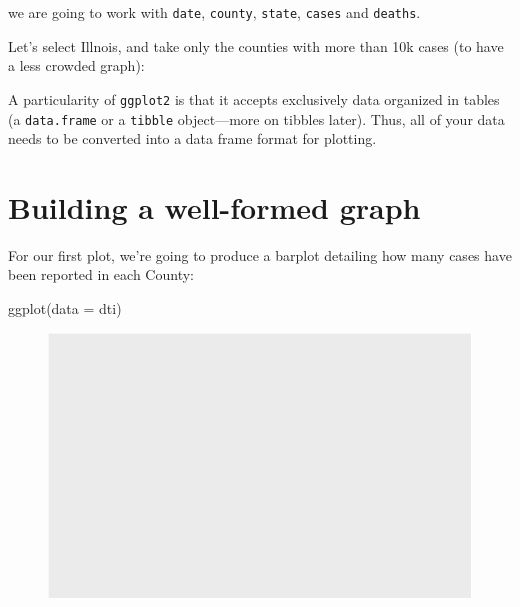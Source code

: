 \documentclass[
  letterpaper,
  DIV=11,
  numbers=noendperiod]{scrreprt}
\newenvironment{Shaded}{\begin{snugshade}}{\end{snugshade}}
\newcommand{\AttributeTok}[1]{\textcolor[rgb]{0.40,0.45,0.13}{#1}}
\newcommand{\DecValTok}[1]{\textcolor[rgb]{0.68,0.00,0.00}{#1}}
\newcommand{\FunctionTok}[1]{\textcolor[rgb]{0.28,0.35,0.67}{#1}}
\newcommand{\NormalTok}[1]{\textcolor[rgb]{0.00,0.23,0.31}{#1}}
\newcommand{\OtherTok}[1]{\textcolor[rgb]{0.00,0.23,0.31}{#1}}
\newcommand{\SpecialCharTok}[1]{\textcolor[rgb]{0.37,0.37,0.37}{#1}}
\newcommand{\StringTok}[1]{\textcolor[rgb]{0.13,0.47,0.30}{#1}}
\begin{document}
we are going to work with \texttt{date}, \texttt{county},
\texttt{state}, \texttt{cases} and \texttt{deaths}.

Let's select Illnois, and take only the counties with more than 10k
cases (to have a less crowded graph):

\begin{Shaded}
\end{Shaded}

A particularity of \texttt{ggplot2} is that it accepts exclusively data
organized in tables (a \texttt{data.frame} or a \texttt{tibble}
object---more on tibbles later). Thus, all of your data needs to be
converted into a data frame format for plotting.

\hypertarget{building-a-well-formed-graph}{%
\section{Building a well-formed
graph}\label{building-a-well-formed-graph}}

For our first plot, we're going to produce a barplot detailing how many
cases have been reported in each County:

\begin{Shaded}
\begin{Highlighting}[]
\FunctionTok{ggplot}\NormalTok{(}\AttributeTok{data =}\NormalTok{ dti)}
\end{Highlighting}
\end{Shaded}

\begin{figure}[H]

{\centering \includegraphics{./01-dataviz_files/figure-pdf/unnamed-chunk-4-1.pdf}

}

\end{figure}
\end{document}
